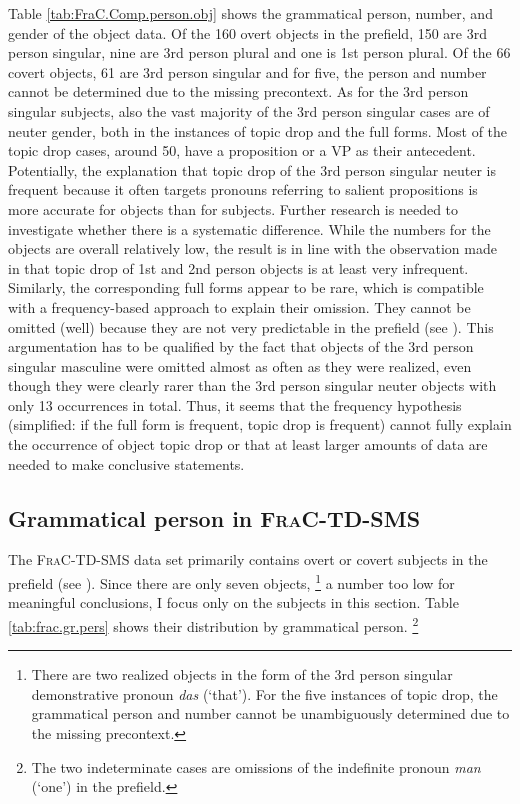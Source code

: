 Table \ref{tab:FraC.Comp.person.obj} shows the grammatical person, number, and gender of the object data.
Of the 160 overt objects in the prefield, 150 are 3rd person singular, nine are 3rd person plural and one is 1st person plural.
Of the 66 covert objects, 61 are 3rd person singular and for five, the person and number cannot be determined due to the missing precontext.
As for the 3rd person singular subjects, also the vast majority of the 3rd person singular cases are of neuter gender, both in the instances of topic drop and the full forms.
Most of the topic drop cases, around 50, have a proposition or a VP as their antecedent. 
Potentially, the explanation that topic drop of the 3rd person singular neuter is frequent because it often targets pronouns referring to salient  propositions is more accurate for objects than for subjects.
Further research is needed to investigate whether there is a systematic difference.
While the numbers for the objects are overall relatively low, the result is in line with the observation made in  that topic drop of 1st and 2nd person objects is at least very infrequent.
Similarly, the corresponding full forms appear to be rare, which is compatible with a frequency-based approach to explain their omission.
They cannot be omitted (well) because they are not very predictable  in the prefield (see ).
This argumentation has to be qualified by the fact that objects of the 3rd person singular masculine were omitted almost as often as they were realized, even though they were clearly rarer than the 3rd person singular neuter objects with only 13 occurrences in total.
Thus, it seems that the frequency hypothesis (simplified: if the full form is frequent, topic drop is frequent) cannot fully explain the occurrence of object topic drop or that at least larger amounts of data are needed to make conclusive statements.

\subsection{Grammatical person in \textsc{FraC-TD-SMS}}\label{sec:frac.td.sms.person}
The \textsc{FraC-TD-SMS} data set primarily contains overt or covert subjects in the prefield (see ).
Since there are only seven objects,%
\footnote{There are two realized objects in the form of the 3rd person singular demonstrative pronoun \textit{das} (`that').
For the five instances of topic drop, the grammatical person and number cannot be unambiguously determined due to the missing precontext.}
a number too low for meaningful conclusions, I focus only on the subjects in this section.
Table \ref{tab:frac.gr.pers} shows their distribution by grammatical person.%
\footnote{The two indeterminate cases are omissions of the indefinite pronoun \textit{man} (`one') in the prefield.}

